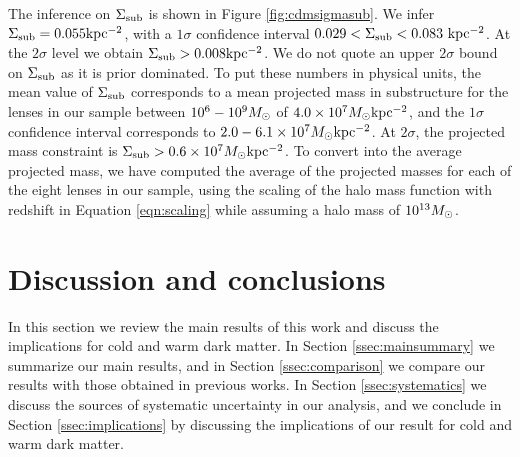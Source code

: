 The inference on $\Sigma_{\rm{sub}}$ is shown in Figure \ref{fig:cdmsigmasub}. We infer $\Sigma_{\rm{sub}} = 0.055 \rm{kpc^{-2}}$, with a $1 \sigma$ confidence interval $0.029 < \Sigma_{\rm{sub}} < 0.083 \ \rm{kpc^{-2}}$. At the $2 \sigma$ level we obtain $\Sigma_{\rm{sub}} > 0.008 \rm{kpc^{-2}}$. We do not quote an upper $2\sigma$ bound on $\Sigma_{\rm{sub}}$ as it is prior dominated. To put these numbers in physical units, the mean value of $\Sigma_{\rm{sub}}$ corresponds to a mean projected mass in substructure for the lenses in our sample between $10^6 - 10^{9} {M_{\odot}}$ of $4.0 \times 10^{7} {M_{\odot}} \rm{kpc^{-2}}$, and the $1 \sigma$ confidence interval corresponds to $2.0 - 6.1 \times 10^{7} {M_{\odot}} \rm{kpc^{-2}}$. At $2 \sigma$, the projected mass constraint is $\Sigma_{\rm{sub}} > 0.6 \times 10^{7} {M_{\odot}} \rm{kpc^{-2}}$. To convert into the average projected mass, we have computed the average of the projected masses for each of the eight lenses in our sample, using the scaling of the halo mass function with redshift in Equation \ref{eqn:scaling} while assuming a halo mass of $10^{13} {M_{\odot}}$. 

\section{Discussion and conclusions}
\label{sec:discussion}
In this section we review the main results of this work and discuss the implications for cold and warm dark matter. In Section \ref{ssec:mainsummary} we summarize our main results, and in Section \ref{ssec:comparison} we compare our results with those obtained in previous works. In Section \ref{ssec:systematics} we discuss the sources of systematic uncertainty in our analysis, and we conclude in Section \ref{ssec:implications} by discussing the implications of our result for cold and warm dark matter. 

